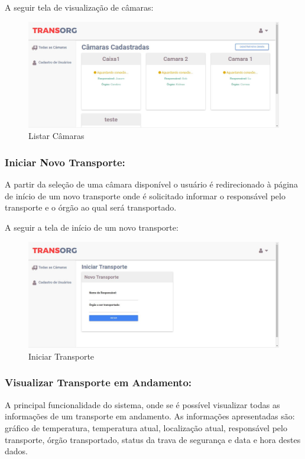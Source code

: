 	A seguir tela de visualização de câmaras:

\begin{figure}[H]
\centering
\includegraphics[width=16cm]{figuras/listaCamaras_software.JPG}
\caption{Listar Câmaras}
\end{figure}

\subsubsection{Iniciar Novo Transporte:}
	A partir da seleção de uma câmara disponível o usuário é redirecionado à página de início de um novo transporte onde é solicitado informar o responsável pelo transporte e o órgão ao qual será transportado.
	
	A seguir a tela de início de um novo transporte:

\begin{figure}[H]
\centering
\includegraphics[width=16cm]{figuras/iniciarTransporte_software.JPG}
\caption{Iniciar Transporte}
\end{figure}

\subsubsection{Visualizar Transporte em Andamento:}
	A principal funcionalidade do sistema, onde se é possível visualizar todas as informações de um transporte em andamento. As informações apresentadas são: gráfico de temperatura, temperatura atual, localização atual, responsável pelo transporte, órgão transportado, status da trava de segurança e data e hora destes dados.

